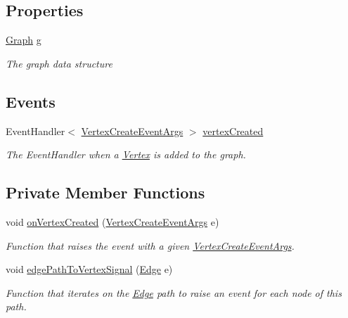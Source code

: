 \subsection*{Properties}
\begin{DoxyCompactItemize}
\item 
\hyperlink{classGraph}{Graph} \hyperlink{classBusLineParser_abea0c70aead9b38f2162eb900826540f}{g}
\begin{DoxyCompactList}\small\item\em The graph data structure\end{DoxyCompactList}\end{DoxyCompactItemize}
\subsection*{Events}
\begin{DoxyCompactItemize}
\item 
Event\+Handler$<$ \hyperlink{classVertexCreateEventArgs}{Vertex\+Create\+Event\+Args} $>$ \hyperlink{classBusLineParser_af57e1b61eb76dec97cb8f5c08b1cf2f3}{vertex\+Created}
\begin{DoxyCompactList}\small\item\em The Event\+Handler when a \hyperlink{structVertex}{Vertex} is added to the graph.\end{DoxyCompactList}\end{DoxyCompactItemize}
\subsection*{Private Member Functions}
\begin{DoxyCompactItemize}
\item 
void \hyperlink{classBusLineParser_a0acd0fa8a61e2471c093d466a35dd6ab}{on\+Vertex\+Created} (\hyperlink{classVertexCreateEventArgs}{Vertex\+Create\+Event\+Args} e)
\begin{DoxyCompactList}\small\item\em Function that raises the event with a given \hyperlink{classVertexCreateEventArgs}{Vertex\+Create\+Event\+Args}. \end{DoxyCompactList}\item 
void \hyperlink{classBusLineParser_a996f46bf4ce1bf445e4466d1ad8bda11}{edge\+Path\+To\+Vertex\+Signal} (\hyperlink{classEdge}{Edge} e)
\begin{DoxyCompactList}\small\item\em Function that iterates on the \hyperlink{classEdge}{Edge} path to raise an event for each node of this path. \end{DoxyCompactList}\end{DoxyCompactItemize}
